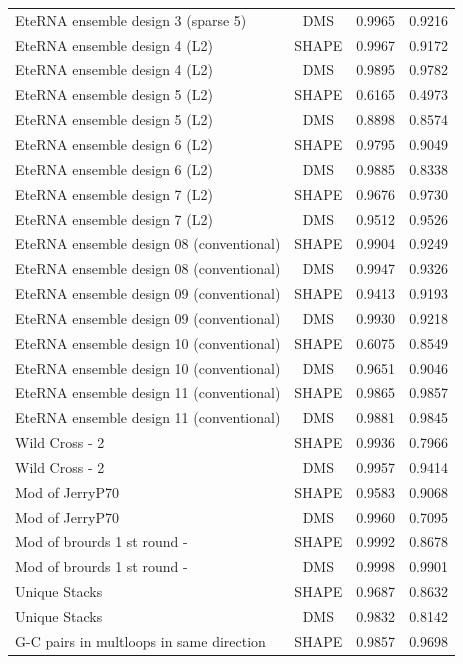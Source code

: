 \documentclass[letter]{bioinfo}
\begin{document}
\begin{center}
\begin{longtable}{lccc}
EteRNA ensemble design 3 (sparse 5)	&	DMS	&	0.9965 	&	0.9216 	\\
EteRNA ensemble design 4 (L2)	&	SHAPE	&	0.9967 	&	0.9172 	\\
EteRNA ensemble design 4 (L2)	&	DMS	&	0.9895 	&	0.9782 	\\
EteRNA ensemble design 5 (L2)	&	SHAPE	&	0.6165 	&	0.4973 	\\
EteRNA ensemble design 5 (L2)	&	DMS	&	0.8898 	&	0.8574 	\\
EteRNA ensemble design 6 (L2)	&	SHAPE	&	0.9795 	&	0.9049 	\\
EteRNA ensemble design 6 (L2)	&	DMS	&	0.9885 	&	0.8338 	\\
EteRNA ensemble design 7 (L2)	&	SHAPE	&	0.9676 	&	0.9730 	\\
EteRNA ensemble design 7 (L2)	&	DMS	&	0.9512 	&	0.9526 	\\
EteRNA ensemble design 08 (conventional)	&	SHAPE	&	0.9904 	&	0.9249 	\\
EteRNA ensemble design 08 (conventional)	&	DMS	&	0.9947 	&	0.9326 	\\
EteRNA ensemble design 09 (conventional)	&	SHAPE	&	0.9413 	&	0.9193 	\\
EteRNA ensemble design 09 (conventional)	&	DMS	&	0.9930 	&	0.9218 	\\
EteRNA ensemble design 10 (conventional)	&	SHAPE	&	0.6075 	&	0.8549 	\\
EteRNA ensemble design 10 (conventional)	&	DMS	&	0.9651 	&	0.9046 	\\
EteRNA ensemble design 11 (conventional)	&	SHAPE	&	0.9865 	&	0.9857 	\\
EteRNA ensemble design 11 (conventional)	&	DMS	&	0.9881 	&	0.9845 	\\
Wild Cross - 2	&	SHAPE	&	0.9936 	&	0.7966 	\\
Wild Cross - 2	&	DMS	&	0.9957 	&	0.9414 	\\
Mod of JerryP70	&	SHAPE	&	0.9583 	&	0.9068 	\\
Mod of JerryP70	&	DMS	&	0.9960 	&	0.7095 	\\
Mod of brourds 1 st round -	&	SHAPE	&	0.9992 	&	0.8678 	\\
Mod of brourds 1 st round -	&	DMS	&	0.9998 	&	0.9901 	\\
Unique Stacks	&	SHAPE	&	0.9687 	&	0.8632 	\\
Unique Stacks	&	DMS	&	0.9832 	&	0.8142 	\\
G-C pairs in multloops in same direction	&	SHAPE	&	0.9857 	&	0.9698 	\\

\end{longtable}
\end{center}
\end{document}
